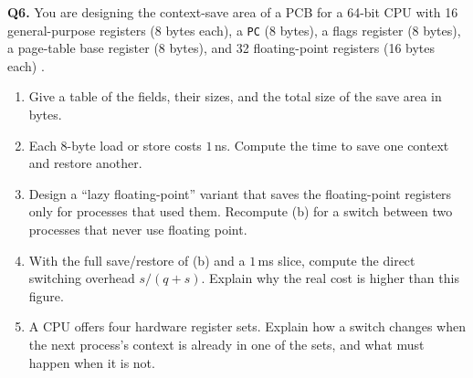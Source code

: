 \documentclass[11pt]{article}
\begin{document}
\textbf{Q6.} You are designing the context-save area of a PCB for a 64-bit CPU with 16 general-purpose registers (8 bytes each), a \texttt{PC} (8 bytes), a flags register (8 bytes), a page-table base register (8 bytes), and 32 floating-point registers (16 bytes each) \cite{BovetCesati_understanding_linux_kernel}.
\begin{enumerate}
  \item[(a)] Give a table of the fields, their sizes, and the total size of the save area in bytes.
  \item[(b)] Each 8-byte load or store costs $1$\,ns. Compute the time to save one context and restore another.
  \item[(c)] Design a ``lazy floating-point'' variant that saves the floating-point registers only for processes that used them. Recompute (b) for a switch between two processes that never use floating point.
  \item[(d)] With the full save/restore of (b) and a $1$\,ms slice, compute the direct switching overhead $s/(q+s)$. Explain why the real cost is higher than this figure.
  \item[(e)] A CPU offers four hardware register sets. Explain how a switch changes when the next process's context is already in one of the sets, and what must happen when it is not.
\end{enumerate}



\end{document}
